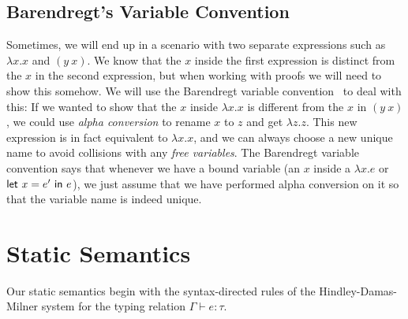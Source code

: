 \subsection{Barendregt's Variable Convention}

Sometimes, we will end up in a scenario with two separate expressions
such as $\lambda x . x$ and $(y \ x)$. We know that the $x$ inside the first
expression is distinct from the $x$ in the second expression, but when
working with proofs we will need to show this somehow. We will use the
Barendregt variable convention~\cite{barendregt1984} to deal with
this: If we wanted to show that the $x$ inside ${\lambda x . x}$ is
different from the $x$ in $(y \ x)$, we could use \emph{alpha
  conversion} to rename $x$ to $z$ and get ${\lambda z . z}$. This new
expression is in fact equivalent to ${\lambda x . x}$, and we can always
choose a new unique name to avoid collisions with any \emph{free
  variables}. The Barendregt variable convention says that whenever we
have a bound variable (an $x$ inside a $\lambda x . e$ or
$\mathsf{let} \ x=e' \ \mathsf{in} \ e$), we just assume that we have performed alpha
conversion on it so that the variable name is indeed unique.

\section{Static Semantics}
Our static semantics begin with the syntax-directed
rules of the Hindley-Damas-Milner system for the typing relation $\Gamma \vdash e : \tau$.



